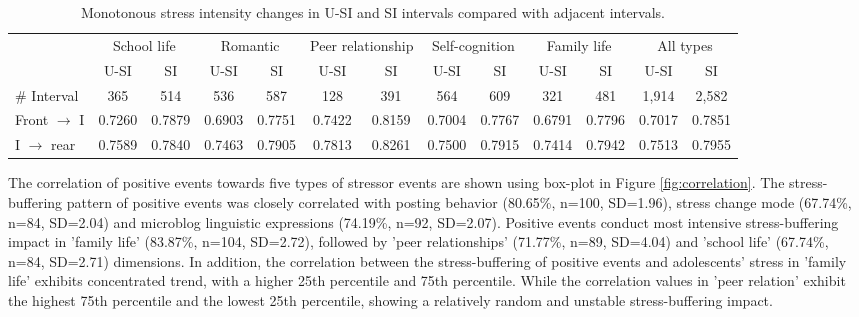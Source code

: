 \begin{table}
\begin{center}
\caption{\small{Monotonous stress intensity changes in U-SI and SI intervals compared with adjacent intervals.}}
\small{
\begin{tabular}{l cccccc cccccc} \\\hline\hline
\multirow{2}{1cm}{}
&\multicolumn{2}{c}{School life}
&\multicolumn{2}{c}{Romantic}
&\multicolumn{2}{c}{Peer relationship}
&\multicolumn{2}{c}{Self-cognition}
&\multicolumn{2}{c}{Family life}
&\multicolumn{2}{c}{All types}\\
&U-SI	    &	SI	        &U-SI	    &SI	        &U-SI	   &SI	
&U-SI	    &	SI	        &	U-SI	&SI	        &U-SI	   &SI\\  \hline
\# Interval         &   365	        &	514	        &	536	        &	587	        &128	    &	391	        &	564	           &	609	            &	321	        &	481	        &	1,914	    &2,582	 \\
Front $\rightarrow$ I &	0.7260 	&	0.7879 	&	0.6903 	&	0.7751 	&	0.7422 	&	0.8159 	&	0.7004 	&	0.7767 	&	0.6791 &	0.7796 	&	0.7017 	&   0.7851\\
I $\rightarrow$ rear  &	0.7589 	&	0.7840 	&	0.7463 	&	0.7905 	&	0.7813 	&	0.8261 	&	0.7500 	&	0.7915 	&	0.7414 	&	0.7942 	&	0.7513 	&   0.7955\\ \hline \hline
\end{tabular}}%
\label{tab:fontrear}
\end{center}
\end{table}

The correlation of positive events towards five types of stressor events
are shown using box-plot in Figure \ref{fig:correlation}.
The stress-buffering pattern of positive events
was closely correlated with posting behavior (80.65\%, n=100, SD=1.96),
stress change mode (67.74\%, n=84, SD=2.04) and microblog linguistic expressions (74.19\%, n=92, SD=2.07).
Positive events conduct most intensive stress-buffering impact in 'family life' (83.87\%, n=104, SD=2.72),
followed by 'peer relationships' (71.77\%, n=89, SD=4.04) and 'school life' (67.74\%, n=84, SD=2.71) dimensions.
In addition,
the correlation between the stress-buffering of positive events
and adolescents' stress in 'family life'
exhibits concentrated trend,
with a higher 25th percentile and 75th percentile.
While the correlation values in 'peer relation'
exhibit the highest 75th percentile and the lowest 25th percentile,
showing a relatively random and unstable stress-buffering impact.


